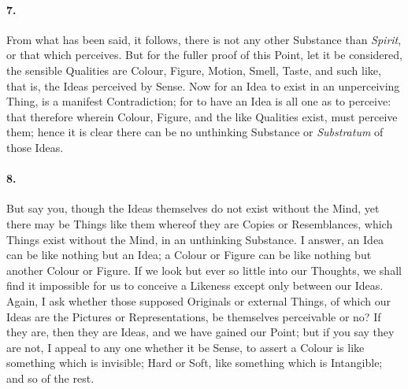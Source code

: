 \documentclass[]{article}
\newenvironment{sectionbody}{\begin{multicols}{2}}{\end{multicols}}
\begin{document}
\begin{sectionbody}
\paragraph{7.} From what has been said, it follows, there is not any other
Substance than \emph{Spirit}, or that which perceives.  But for
the fuller proof of this Point, let it be considered, the
sensible Qualities are Colour, Figure, Motion, Smell, Taste, and
such like, that is, the Ideas perceived by Sense.  Now for an
Idea to exist in an unperceiving Thing, is a manifest
Contradiction; for to have an Idea is all one as to perceive:
that therefore wherein Colour, Figure, and the like Qualities
exist, must perceive them; hence it is clear there can be no
unthinking Substance or \emph{Substratum} of those Ideas.



\paragraph{8.} But say you, though the Ideas themselves do not exist without the
Mind, yet there may be Things like them whereof they are Copies
or Resemblances, which Things exist without the Mind, in an
unthinking Substance.  I answer, an Idea can be like nothing but
an Idea; a Colour or Figure can be like nothing but another
Colour or Figure.  If we look but ever so little into our
Thoughts, we shall find it impossible for us to conceive a
Likeness except only between our Ideas.  Again, I ask whether
those supposed Originals or external Things, of which our Ideas
are the Pictures or Representations, be themselves perceivable or
no?  If they are, then they are Ideas, and we have gained our
Point; but if you say they are not, I appeal to any one whether
it be Sense, to assert a Colour is like something which is
invisible; Hard or Soft, like something which is Intangible; and
so of the rest.




\end{sectionbody}
\end{document}
